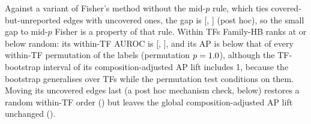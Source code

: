 Against a variant of Fisher's method without the mid-$p$ rule, which ties covered-but-unreported edges with uncovered ones, the gap is \nPairAdjFiSec{} [\nPairAdjFiSecLo{}, \nPairAdjFiSecHi{}] (post hoc), so the small gap to mid-$p$ Fisher is a property of that rule.
Within TFs Family-HB ranks at or below random: its within-TF AUROC is \nAucHbPert{} [\nAucHbPertLo{}, \nAucHbPertHi{}], and its AP is below that of every within-TF permutation of the labels (permutation $p=1.0{}$), although the TF-bootstrap interval of its composition-adjusted AP lift includes 1, because the bootstrap generalises over TFs while the permutation test conditions on them.
Moving its uncovered edges last (a post hoc mechanism check, below) restores a random within-TF order (\nAucUlPert{}) but leaves the global composition-adjusted AP lift unchanged (\nAdjUlPert{}).



